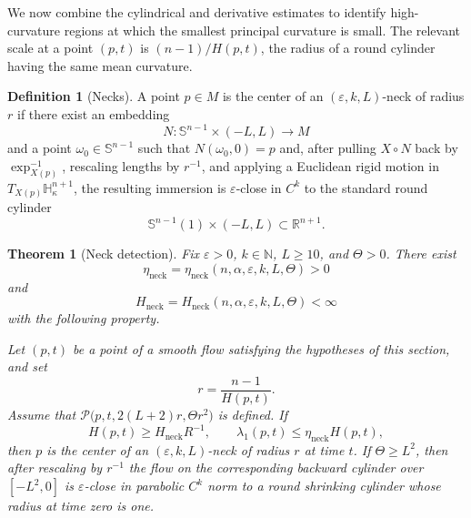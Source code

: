 \documentclass[11pt,reqno]{amsart}
\newtheorem{theorem}[proposition]{Theorem}
\theoremstyle{definition}
\newtheorem{definition}[proposition]{Definition}
\theoremstyle{remark}
\numberwithin{equation}{section}
\newcommand{\Hh}{\mathbb H}
\newcommand{\Sph}{\mathbb S}
\newcommand{\eps}{\varepsilon}
\begin{document}
We now combine the cylindrical and derivative estimates to identify
high-curvature regions at which the smallest principal curvature is small.
The relevant scale at a point $(p,t)$ is $(n-1)/{H(p,t)}$, the radius of a round cylinder having the same mean curvature.

\begin{definition}[Necks]
  A point $p\in M$ is the center of an $(\eps,k,L)$-neck of radius $r$ if
  there exist an embedding
  \begin{equation*}
  N:\Sph^{n-1}\times(-L,L)\longrightarrow M
  \end{equation*}
  and a point $\omega_0\in\Sph^{n-1}$ such that $N(\omega_0,0)=p$ and,
  after pulling $X\circ N$ back by $\exp_{X(p)}^{-1}$, rescaling lengths by
  $r^{-1}$, and applying a Euclidean rigid motion in
  $T_{X(p)}\Hh^{n+1}_{\kappa}$, the resulting immersion is
  $\eps$-close in $C^k$ to the standard round cylinder
  \begin{equation*}
  \Sph^{n-1}(1)\times(-L,L)\subset\mathbb R^{n+1}.
  \end{equation*}
\end{definition}

\begin{theorem}[Neck detection]\label{thm:neck-detection}
  Fix $\eps>0$, $k\in\mathbb N$, $L\geq10$, and $\Theta>0$.  There exist
  \begin{equation*}
  \eta_{\mathrm{neck}}
  =\eta_{\mathrm{neck}}(n,\alpha,\eps,k,L,\Theta)>0
  \end{equation*}
  and
  \begin{equation*}
  H_{\mathrm{neck}}
  =H_{\mathrm{neck}}(n,\alpha,\eps,k,L,\Theta)<\infty
  \end{equation*}
  with the following property.

  Let $(p,t)$ be a point of a smooth flow satisfying the hypotheses of this
  section, and set
  \begin{equation*}
  r=\frac{n-1}{H(p,t)}.
  \end{equation*}
  Assume that $ \mathcal P\bigl(p,t,2(L+2)r,\Theta r^2\bigr)$  
  is defined.  If
  \begin{equation*}
  H(p,t)\geq H_{\mathrm{neck}}R^{-1},
  \qquad
  \lambda_1(p,t)\leq\eta_{\mathrm{neck}}H(p,t),
  \end{equation*}
  then $p$ is the center of an $(\eps,k,L)$-neck of radius $r$ at time $t$.
  If $\Theta\geq L^2$, then after rescaling by $r^{-1}$ the flow on the
  corresponding backward cylinder over $[-L^2,0]$ is $\eps$-close in
  parabolic $C^k$ norm to a round shrinking cylinder whose radius at time
  zero is one.
\end{theorem}
\end{document}
